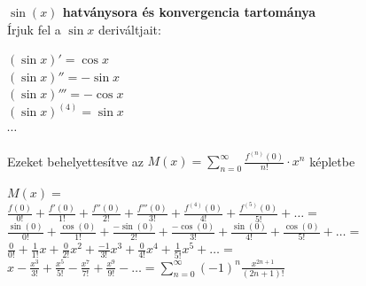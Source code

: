 \documentclass[tikz,12pt,margin=0px]{article}
\newcommand\ddfrac[2]{\frac{\displaystyle #1}{\displaystyle #2}}
\begin{document}
      \begin{center}
        \end{center}
\newpage
    \noindent \textbf{$\sin(x)$ hatványsora és konvergencia tartománya}\\

    \noindent Írjuk fel a $\sin x$ deriváltjait:

    \begin{center}
        $(\sin x)' = \cos x$\\
        $(\sin x)'' = -\sin x$\\
        $(\sin x)''' = -\cos x$\\
        $(\sin x)^{(4)} = \sin x$\\
        $\cdots$
    \end{center}

    \noindent Ezeket behelyettesítve az $M(x) = \sum\limits_{n=0}^{\infty}\ddfrac{f^{(n)}(0)}{n!} \cdot x^{n}$ képletbe
    \begin{spacing}{2}
        \begin{center}
            $M(x) = $\\
            $\ddfrac{f(0)}{0!} + \ddfrac{f'(0)}{1!} + \ddfrac{f''(0)}{2!} + \ddfrac{f'''(0)}{3!} + \ddfrac{f^{(4)}(0)}{4!} + \ddfrac{f^{(5)}(0)}{5!} + \ldots =$\\
            $\ddfrac{\sin(0)}{0!} + \ddfrac{\cos(0)}{1!} + \ddfrac{-\sin(0)}{2!} + \ddfrac{-\cos(0)}{3!} + \ddfrac{\sin(0)}{4!} + \ddfrac{\cos(0)}{5!} + \ldots =$\\
            $\ddfrac{0}{0!} + \ddfrac{1}{1!}x + \ddfrac{0}{2!}x^{2} + \ddfrac{-1}{3!}x^{3} + \ddfrac{0}{4!}x^{4} + \ddfrac{1}{5!}x^{5} + \ldots =$ \\
            $x - \ddfrac{x^3}{3!} + \ddfrac{x^5}{5!} - \ddfrac{x^7}{7!} + \ddfrac{x^9}{9!} - \ldots = \sum\limits_{n=0}^{\infty}(-1)^{n}\ddfrac{x^{2n + 1}}{(2n + 1)!}$
        \end{center}
    \end{spacing}
\end{document}
